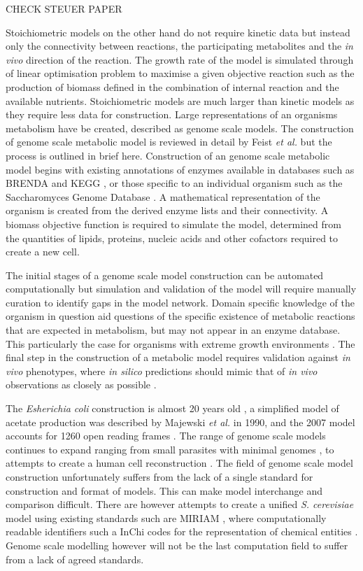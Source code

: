CHECK STEUER PAPER

Stoichiometric models on the other hand do not require kinetic data but instead only the connectivity between reactions, the participating metabolites and the \emph{in vivo} direction of the reaction. The growth rate of the model is simulated through of linear optimisation problem to maximise a given objective reaction such as the production of biomass defined in the combination of internal reaction and the available nutrients. Stoichiometric models are much larger than kinetic models as they require less data for construction. Large representations of an organisms metabolism have be created, described as genome scale models. The construction of genome scale metabolic model is reviewed in detail by Feist \emph{et al.} \cite{feist2009} but the process is outlined in brief here. Construction of an genome scale metabolic model begins with existing annotations of enzymes available in databases such as BRENDA \cite{schomburg2004} and KEGG \cite{kaneshisa2000}, or those specific to an individual organism such as the Saccharomyces Genome Database \cite{sgd}. A mathematical representation of the organism is created from the derived enzyme lists and their connectivity. A biomass objective function is required to simulate the model, determined from the quantities of lipids, proteins, nucleic acids and other cofactors required to create a new cell.

The initial stages of a genome scale model construction can be automated computationally but simulation and validation of the model will require manually curation to identify gaps in the model network. Domain specific knowledge of the organism in question aid questions of the specific existence of metabolic reactions that are expected in metabolism, but may not appear in an enzyme database. This particularly the case for organisms with extreme growth environments \cite{strauer_cyano}. The final step in the construction of a metabolic model requires validation against \emph{in vivo} phenotypes, where \emph{in silico} predictions should mimic that of \emph{in vivo} observations as closely as possible \cite{famili2003}.

The \emph{Esherichia coli} construction is almost 20 years old \cite{feist2008}, a simplified model of acetate production was described by Majewski \emph{et al.} in 1990, and the 2007 model accounts for 1260 open reading frames \cite{feist2007}. The range of genome scale models continues to expand ranging from small parasites with minimal genomes \cite{genitalium}, to attempts to create a human cell reconstruction \cite{human}. The field of genome scale model construction unfortunately suffers from the lack of a single standard for construction and format of models. This can make model interchange and comparison difficult. There are however attempts to create a unified \emph{S. cerevisiae} model \cite{herrgard} using existing standards such are MIRIAM \cite{miriam}, where computationally readable identifiers such a InChi codes for the representation of chemical entities \cite{inchi}. Genome scale modelling however will not be the last computation field to suffer from a lack of agreed standards.

